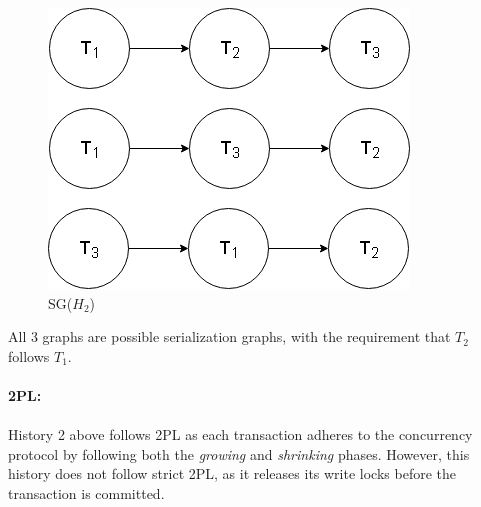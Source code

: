 \documentclass[12pt, letterpaper]{report}
\begin{document}
\begin{figure}[H]
	\centering
	\includegraphics[width=0.5\columnwidth]{h2.png}
	\caption{SG($H_2$)}
\end{figure}

All 3 graphs are possible serialization graphs, with the requirement that $T_2$ follows $T_1$.
\\ \\
\textbf{2PL:}
\\ \\
History 2 above follows 2PL as each transaction adheres to the concurrency protocol by following both the \textit{growing} and \textit{shrinking} phases. However, this history does not follow strict 2PL, as it releases its write locks before the transaction is committed.
\end{document}

